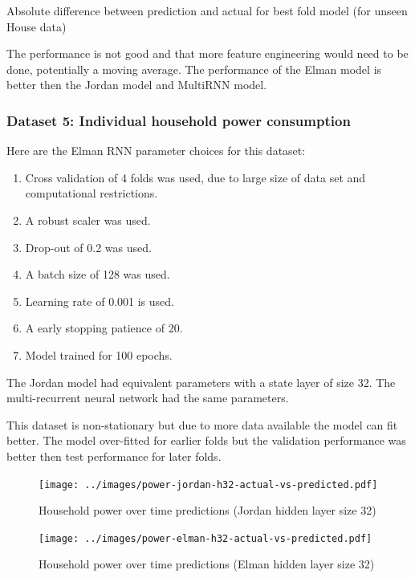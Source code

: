 \documentclass[conference]{IEEEtran}
\begin{document}
\begin{table}[H]
	\caption{Absolute difference between prediction and actual for best fold model (for unseen House data)}
	\label{tab:house-rnn-summary}
\end{table}

The performance is not good and that more feature engineering would need to be done, potentially a moving average. The performance of the Elman model is better then the Jordan model and MultiRNN model.

\subsubsection{Dataset 5: Individual household power consumption}

Here are the Elman RNN parameter choices for this dataset:

\begin{enumerate}[]
	\item Cross validation of 4 folds was used, due to large size of data set and computational restrictions.
	\item A robust scaler was used.
	\item Drop-out of 0.2 was used.
	\item A batch size of 128 was used.
	\item Learning rate of 0.001 is used.
	\item A early stopping patience of 20.
	\item Model trained for 100 epochs.
\end{enumerate}

The Jordan model had equivalent parameters with a state layer of size 32. The multi-recurrent neural network had the same parameters.

This dataset is non-stationary but due to more data available the model can fit better. The model over-fitted for earlier folds but the validation performance was better then test performance for later folds.

\begin{figure}[H] 
	\centering
	\texttt{[image: ../images/power-jordan-h32-actual-vs-predicted.pdf]}
	\caption{Household power over time predictions (Jordan hidden layer size 32)}
	\label{fig:power-predictions-jordan}
\end{figure}

\begin{figure}[H] 
	\centering
	\texttt{[image: ../images/power-elman-h32-actual-vs-predicted.pdf]}
	\caption{Household power over time predictions (Elman hidden layer size 32)}
	\label{fig:power-predictions-elman}
\end{figure}
\end{document}
